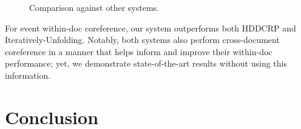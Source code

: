 \documentclass[11pt,a4paper]{article}
\begin{document}
\begin{figure}
\label{fig:againstsystems}
\caption{Comparison against other systems.}
\end{figure}

For event within-doc coreference, our system outperforms both HDDCRP and Iteratively-Unfolding.  Notably, both systems also perform cross-document coreference in a manner that helps inform and improve their within-doc performance; yet, we demonstrate state-of-the-art results without using this information.

\section*{Conclusion}
%
%


\end{document}

